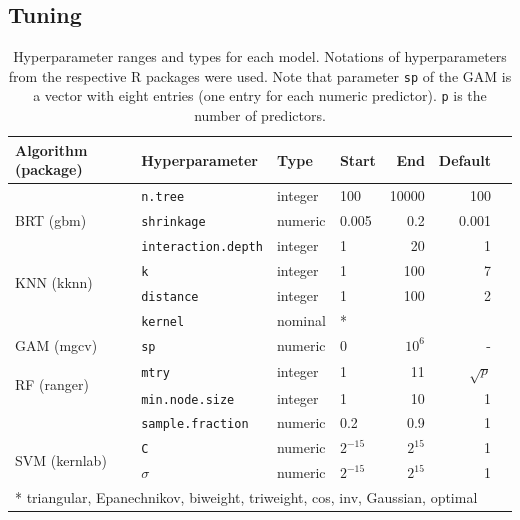 \documentclass[review]{elsarticle}
\begin{document}
\subsection{Tuning}
\label{subsec:methods_tuning}

\begin{table}[b!]
\centering
\caption[t]{Hyperparameter ranges and types for each model.
	Notations of hyperparameters from the respective R packages were used.
	Note that parameter \texttt{sp} of the GAM is a vector with eight entries (one entry for each numeric predictor). \texttt{p} is the number of predictors.}
\begingroup\footnotesize
\begin{tabular}{llllrrr}
	\\
	Algorithm (package)            & Hyperparameter             & Type    & Start     & End      & Default    \\
	\hline
	\multirow{3}{*}{BRT (gbm)}     & \texttt{n.tree}            & integer & 100       & 10000    & 100        \\
	                               & \texttt{shrinkage}         & numeric & 0.005         & 0.2     & 0.001      \\
	                               & \texttt{interaction.depth} & integer & 1         & 20       & 1          \\
	\midrule
	\multirow{2}{*}{KNN (kknn)}    & \texttt{k}                 & integer & 1         & 100      & 7          \\
								   & \texttt{distance}          & integer & 1         & 100      & 2          \\
								   & \texttt{kernel}            & nominal & *     &           &          \\
	\midrule
	\multirow{1}{*}{GAM (mgcv)}    & \texttt{sp}                & numeric & 0         & $10^{6}$ & -          \\
	\midrule
	\multirow{2}{*}{RF (ranger)}   & \texttt{mtry}              & integer & 1         & 11       & $\sqrt{p}$ \\
	                               & \texttt{min.node.size}     & integer & 1         & 10       & 1          \\
	                               & \texttt{sample.fraction}   & numeric & 0.2       & 0.9      & 1          \\
	\midrule
	\multirow{2}{*}{SVM (kernlab)} & \texttt{C}                 & numeric & $2^{-15}$ & $2^{15}$ & 1          \\
	                               & \texttt{$\sigma$}          & numeric & $2^{-15}$ & $2^{15}$ & 1          \\
	\bottomrule
	\multicolumn{6}{l}{* triangular, Epanechnikov, biweight, triweight, cos, inv, Gaussian, optimal}     \\
\end{tabular}
\endgroup
\label{tab:hyperparameter_limits}
\end{table}
\end{document}
